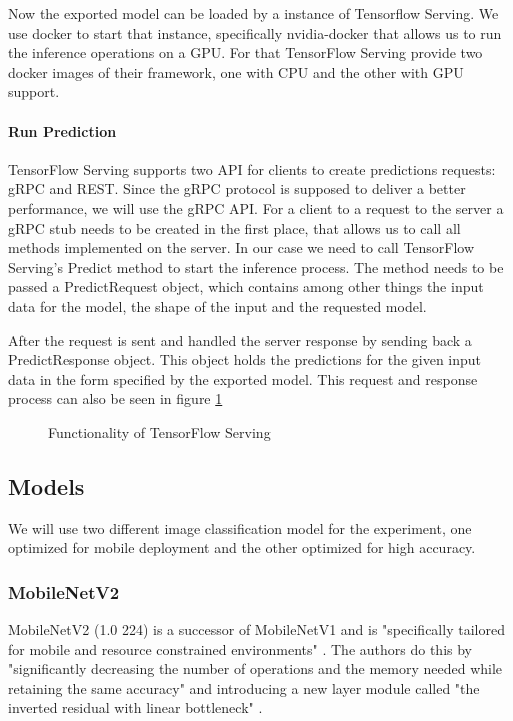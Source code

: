 Now the exported model can be loaded by a instance of Tensorflow Serving.
We use docker to start that instance, specifically nvidia-docker that allows us to run the inference operations on a GPU. For that TensorFlow Serving provide two docker images of their framework, one with CPU and the other with GPU support.

\paragraph{Run Prediction}
TensorFlow Serving supports two API for clients to create predictions requests: gRPC and REST. Since the gRPC protocol is supposed to deliver a better performance, we will use the gRPC API.
For a client to a request to the server a gRPC stub needs to be created in the first place, that allows us to call all methods implemented on the server. In our case we need to call TensorFlow Serving's Predict method to start the inference process. The method needs to be passed a PredictRequest object, which contains among other things the input data for the model, the shape of the input and the requested model.%

After the request is sent and handled the server response by sending back a PredictResponse object. This object holds the predictions for the given input data in the form specified by the exported model.
This request and response process can also be seen in figure \ref{fig:cloud}

\begin{figure}[H]
\centering

\caption{Functionality of TensorFlow Serving}
\label{fig:cloud}
\end{figure}
\subsection{Models}
We will use two different image classification model for the experiment, one optimized for mobile deployment and the other optimized for high accuracy.

\subsubsection{MobileNetV2}
MobileNetV2 (1.0 224) is a successor of MobileNetV1 and is "specifically tailored for mobile and resource
constrained environments" \cite{DBLP:journals/corr/abs-1801-04381}. The authors do this by "significantly decreasing the number of operations and the memory needed while retaining the same accuracy"  \cite{DBLP:journals/corr/abs-1801-04381} and introducing a new layer module called "the
inverted residual with linear bottleneck" \cite{DBLP:journals/corr/abs-1801-04381}.
